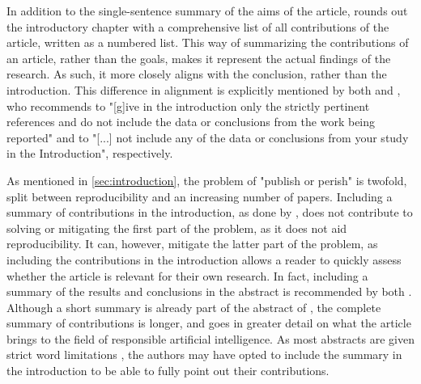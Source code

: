 In addition to the single-sentence summary of the aims of the article, \textcite{Barredo_2020} rounds out the introductory chapter with a comprehensive list of all contributions of the article, written as a numbered list. This way of summarizing the contributions of an article, rather than the goals, makes it represent the actual findings of the research. As such, it more closely aligns with the conclusion, rather than the introduction. This difference in alignment is explicitly mentioned by both \textcite[p.2]{Jha_2014} and \textcite[p.83]{Lin_2012}, who recommends to "[g]ive in the introduction only the strictly pertinent references and do not include the data or conclusions from the work being reported"  and to "[...] not include any of the data or conclusions from your study in the Introduction", respectively.

As mentioned in \autoref{sec:introduction}, the problem of "publish or perish" is twofold, split between reproducibility and an increasing number of papers. Including a summary of contributions in the introduction, as done by \textcite{Barredo_2020}, does not contribute to solving or mitigating the first part of the problem, as it does not aid reproducibility. It can, however, mitigate the latter part of the problem, as including the contributions in the introduction allows a reader to quickly assess whether the article is relevant for their own research. In fact, including a summary of the results and conclusions in the abstract is recommended by both \textcites[p.2]{Jha_2014}[p.82]{Lin_2012}[p.114]{Cuschieri_2019}[p.359]{Davidson_2012}[p.115]{Katz_2006}[p.85]{Rosenfeldt_2000}. Although a short summary is already part of the abstract of \textcite[p.82]{Barredo_2020}, the complete summary of contributions is longer, and goes in greater detail on what the article brings to the field of responsible artificial intelligence. As most abstracts are given strict word limitations \parencite[p.85]{Rosenfeldt_2000}, the authors may have opted to include the summary in the introduction to be able to fully point out their contributions.

